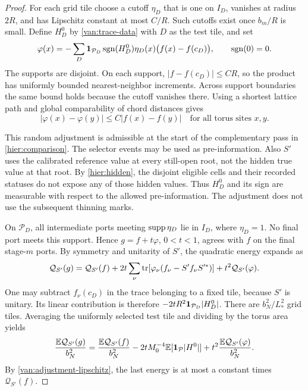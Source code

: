 \begin{proof}
For each grid tile choose a cutoff $\eta_D$ that is one on $I_D$,
vanishes at radius $2R$, and has Lipschitz constant at most $C/R$.
Such cutoffs exist once $b_m/R$ is small. Define $H_D^0$ by
\cref{van:trace-data} with $D$ as the test tile, and set
\[
 \varphi(x)=-\sum_D
   \mathbf 1_{\mathcal P_D}\operatorname{sgn}(H_D^0)
   \eta_D(x)\bigl(f(x)-f(c_D)\bigr),
 \qquad \operatorname{sgn}(0)=0.
\]
The supports are disjoint. On each support, $|f-f(c_D)|\leq CR$,
so the product has uniformly bounded nearest-neighbor increments.
Across support boundaries the same bound holds because the cutoff
vanishes there. Using a shortest lattice path and global comparability
of chord distances gives
\begin{equation}\label{van:adjustment-lipschitz}
 |\varphi(x)-\varphi(y)|\leq C|f(x)-f(y)|
 \quad\text{for all torus sites }x,y.
\end{equation}

This random adjustment is admissible at the start of the complementary
pass in \cref{hier:comparison}. The selector events may be used as
pre-information. Also $S'$ uses the calibrated reference value at every
still-open root, not the hidden true value at that root. By
\cref{hier:hidden}, the disjoint eligible cells and their recorded
statuses do not expose any of those hidden values. Thus $H_D^0$ and
its sign are measurable with respect to the allowed pre-information.
The adjustment does not use the subsequent thinning marks.

On $\mathcal P_D$, all intermediate ports meeting $\operatorname{supp}\eta_D$ lie
in $I_D$, where $\eta_D=1$. No final port meets this support. Hence
$g=f+t\varphi$, $0<t<1$, agrees with $f$ on the final stage-$m$
ports. By symmetry and unitarity of $S'$, the quadratic energy expands as
\[
 \mathcal Q_{S'}(g)=\mathcal Q_{S'}(f)
 +2t\sum_\nu\operatorname{tr}\!\left[
     \varphi_\nu(f_\nu-S'f_\nu S'^*)\right]
 +t^2\mathcal Q_{S'}(\varphi).
\]
One may subtract $f_\nu(c_D)$ in the trace belonging to a fixed tile,
because $S'$ is unitary. Its linear contribution is therefore
$-2tR^2\mathbf 1_{\mathcal P_D}|H_D^0|$. There are $b_N^2/L_*^2$ grid
tiles. Averaging the uniformly selected test tile and dividing by the
torus area yields
\begin{equation}\label{van:adjustment-expansion}
 \frac{\mathbb E\mathcal Q_{S'}(g)}{b_N^2}
 =\frac{\mathbb E\mathcal Q_{S'}(f)}{b_N^2}
 -2tM_0^{-4}\mathbb E[\mathbf 1_{\mathcal P}|H^0|]
 +t^2\frac{\mathbb E\mathcal Q_{S'}(\varphi)}{b_N^2}.
\end{equation}
By \cref{van:adjustment-lipschitz}, the last energy is at most a
constant times $\mathcal Q_{S'}(f)$.


\end{proof}
